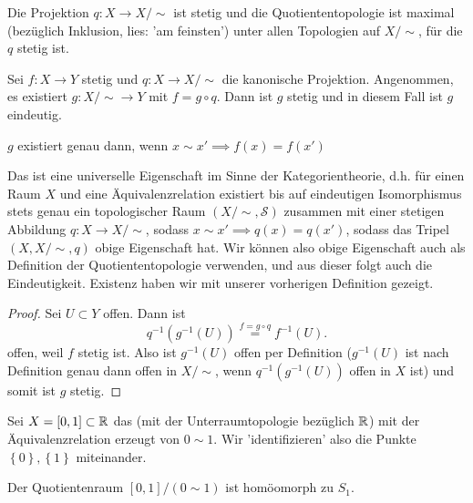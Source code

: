 \begin{remark}
    Die Projektion $q: X \to  X / \sim $ ist stetig und die Quotiententopologie ist maximal (bezüglich Inklusion, lies: 'am feinsten') unter allen Topologien auf $X / \sim $, für die $q$ stetig ist.
\end{remark}
\begin{theorem}\label{thm:universelle-eigenschaft-der-quotiententopologie}
    Sei $f : X \to  Y$ stetig und $q : X \to  X / \sim $ die kanonische Projektion. Angenommen, es existiert $g : X / \sim \to  Y$ mit $f = g \circ  q$. Dann ist $g$ stetig und in diesem Fall ist $g$ eindeutig. \\
    \begin{minipage}{\textwidth}
    \centering    
    \end{minipage}
\end{theorem}
\begin{remark}
    $g$ existiert genau dann, wenn  $x \sim x' \implies f(x) = f(x')$
\end{remark}
\begin{trivial*}
    Das ist eine universelle Eigenschaft im Sinne der Kategorientheorie, d.h. für einen Raum $X$ und eine Äquivalenzrelation existiert bis auf eindeutigen Isomorphismus stets genau ein topologischer Raum $(X / \sim  , \mathcal{S})$ zusammen mit einer stetigen Abbildung $q : X \to  X / \sim $, sodass $x\sim x' \implies q(x) = q(x')$, sodass das Tripel $(X, X / \sim , q)$ obige Eigenschaft hat. Wir können also obige Eigenschaft auch als Definition der Quotiententopologie verwenden, und aus dieser folgt auch die Eindeutigkeit. Existenz haben wir mit unserer vorherigen Definition gezeigt.
\end{trivial*}

\begin{proof}
    Sei $U\subset Y$ offen. Dann ist
    \[
        q^{-1}(g^{-1}(U)) \stackrel{f = g \circ  q}{=} f^{-1}(U)
    .\] 
    offen, weil $f$ stetig ist. Also ist  $g^{-1}(U)$ offen per Definition ($g^{-1}(U)$ ist nach Definition genau dann offen in $X / \sim $, wenn $q^{-1}(g^{-1}(U))$ offen in $X$ ist) und somit ist $g$ stetig. 
\end{proof}
\begin{example}
Sei $X = [0,1]\subset \mathbb{R}$ das  (mit der Unterraumtopologie bezüglich $\mathbb{R}$) mit der Äquivalenzrelation erzeugt von $0\sim 1$. Wir 'identifizieren' also die Punkte $\left \{0\right\} ,\left \{1\right\} $ miteinander.
\end{example}
\begin{theorem}[Kreishomöomorphie]\label{thm:kreis-ist-quotientenraum-von-einheitsintervall}
    Der Quotientenraum $[0,1] / (0\sim 1)$ ist homöomorph zu $S_1$.
\end{theorem}


